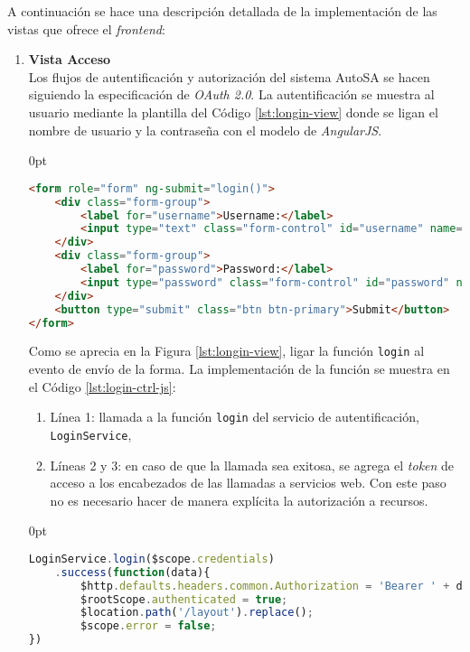 A continuación se hace una descripción detallada de la implementación de las vistas que ofrece el \textit{frontend}:
\begin{enumerate}
\item \textbf{Vista Acceso}\\
Los flujos de autentificación y autorización del sistema AutoSA se hacen siguiendo la especificación de \textit{OAuth 2.0}. La autentificación se muestra al usuario mediante la plantilla del Código \ref{lst:longin-view} donde se ligan el nombre de usuario y la contraseña con el modelo de \textit{AngularJS}.

\begin{adjustwidth}{\listingfixwidth}{0pt}
\begin{lstlisting}[language=HTML, caption={Plantilla HTML de acceso.}, captionpos=b, label={lst:longin-view}]
<form role="form" ng-submit="login()">
	<div class="form-group">
		<label for="username">Username:</label>
		<input type="text" class="form-control" id="username" name="username" ng-model="credentials.username"/>
	</div>
	<div class="form-group">
		<label for="password">Password:</label>
		<input type="password" class="form-control" id="password" name="password" ng-model="credentials.password"/>
	</div>
	<button type="submit" class="btn btn-primary">Submit</button>
</form>
\end{lstlisting}
\end{adjustwidth}


Como se aprecia en la Figura \ref{lst:longin-view}, ligar la función \texttt{login} al evento de envío de la forma. La implementación de la función se muestra en el Código \ref{lst:login-ctrl-js}:
\begin{enumerate}
	\item Línea 1: llamada a la función \texttt{login} del servicio de autentificación, \texttt{LoginService},
	\item Líneas 2 y 3: en caso de que la llamada sea exitosa, se agrega el \textit{token} de acceso a los encabezados de las llamadas a servicios web. Con este paso no es necesario hacer de manera explícita la autorización a recursos.
\end{enumerate}

\pagebreak
\begin{adjustwidth}{\listingfixwidth}{0pt}
\begin{lstlisting}[language=Javascript, caption={Petición de un \textit{token} de acceso.}, captionpos=b, label={lst:login-ctrl-js}]
LoginService.login($scope.credentials)
	.success(function(data){
		$http.defaults.headers.common.Authorization = 'Bearer ' + data.access_token;
		$rootScope.authenticated = true;
		$location.path('/layout').replace();
		$scope.error = false;
})
\end{lstlisting}
\end{adjustwidth}


\end{enumerate}

